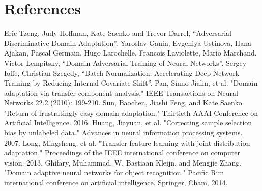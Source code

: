 \documentclass[conference]{IEEEtran}
\begin{document}
\section*{References}

\begin{thebibliography}{00}
 Eric Tzeng, Judy Hoffman, Kate Saenko and Trevor Darrel, ``Adversarial Discriminative Domain Adaptation''.
 Yaroslav Ganin, Evgeniya Ustinova, Hana Ajakan, Pascal Germain, Hugo Larochelle, Francois Laviolette,
    Mario Marchand, Victor Lempitsky, ``Domain-Adversarial Training of Neural Networks''.
 Sergey Ioffe, Christian Szegedy, ``Batch Normalization: Accelerating Deep Network Training by Reducing Internal Covariate Shift''.
 Pan, Sinno Jialin, et al. "Domain adaptation via transfer component analysis." IEEE Transactions on Neural Networks 22.2 (2010): 199-210.
 Sun, Baochen, Jiashi Feng, and Kate Saenko. "Return of frustratingly easy domain adaptation." Thirtieth AAAI Conference on Artificial Intelligence. 2016.
 Huang, Jiayuan, et al. "Correcting sample selection bias by unlabeled data." Advances in neural information processing systems. 2007.
 Long, Mingsheng, et al. "Transfer feature learning with joint distribution adaptation." Proceedings of the IEEE international conference on computer vision. 2013.
 Ghifary, Muhammad, W. Bastiaan Kleijn, and Mengjie Zhang. "Domain adaptive neural networks for object recognition." Pacific Rim international conference on artificial intelligence. Springer, Cham, 2014.
\end{thebibliography}
\end{document}
